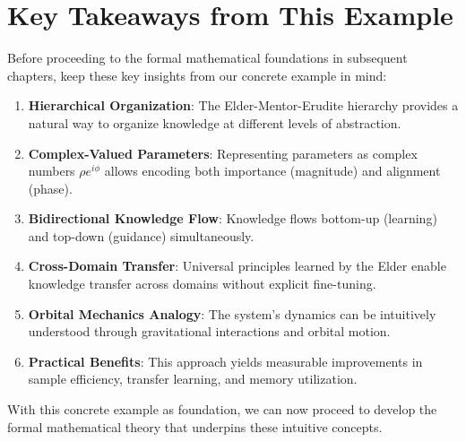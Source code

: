 \section{Key Takeaways from This Example}

Before proceeding to the formal mathematical foundations in subsequent chapters, keep these key insights from our concrete example in mind:

\begin{enumerate}
    \item \textbf{Hierarchical Organization}: The Elder-Mentor-Erudite hierarchy provides a natural way to organize knowledge at different levels of abstraction.
    
    \item \textbf{Complex-Valued Parameters}: Representing parameters as complex numbers $\rho e^{i\phi}$ allows encoding both importance (magnitude) and alignment (phase).
    
    \item \textbf{Bidirectional Knowledge Flow}: Knowledge flows bottom-up (learning) and top-down (guidance) simultaneously.
    
    \item \textbf{Cross-Domain Transfer}: Universal principles learned by the Elder enable knowledge transfer across domains without explicit fine-tuning.
    
    \item \textbf{Orbital Mechanics Analogy}: The system's dynamics can be intuitively understood through gravitational interactions and orbital motion.
    
    \item \textbf{Practical Benefits}: This approach yields measurable improvements in sample efficiency, transfer learning, and memory utilization.
\end{enumerate}

With this concrete example as foundation, we can now proceed to develop the formal mathematical theory that underpins these intuitive concepts.